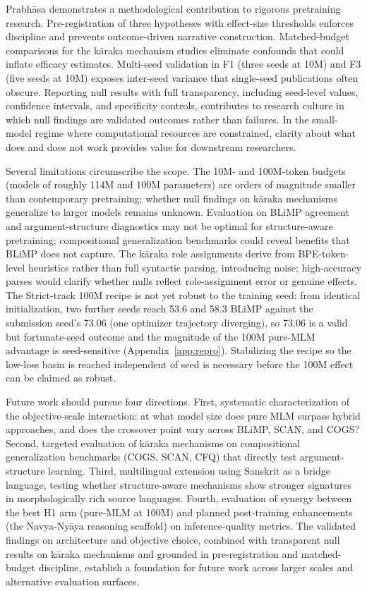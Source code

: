 Prabhāsa demonstrates a methodological contribution to rigorous pretraining research. Pre-registration of three hypotheses with effect-size thresholds enforces discipline and prevents outcome-driven narrative construction. Matched-budget comparisons for the k\=araka mechanism studies eliminate confounds that could inflate efficacy estimates. Multi-seed validation in F1 (three seeds at 10M) and F3 (five seeds at 10M) exposes inter-seed variance that single-seed publications often obscure. Reporting null results with full transparency, including seed-level values, confidence intervals, and specificity controls, contributes to research culture in which null findings are validated outcomes rather than failures. In the small-model regime where computational resources are constrained, clarity about what does and does not work provides value for downstream researchers.

Several limitations circumscribe the scope. The 10M- and 100M-token budgets (models of roughly 114M and 100M parameters) are orders of magnitude smaller than contemporary pretraining; whether null findings on k\=araka mechanisms generalize to larger models remains unknown. Evaluation on BLiMP agreement and argument-structure diagnostics may not be optimal for structure-aware pretraining; compositional generalization benchmarks could reveal benefits that BLiMP does not capture. The k\=araka role assignments derive from BPE-token-level heuristics rather than full syntactic parsing, introducing noise; high-accuracy parses would clarify whether nulls reflect role-assignment error or genuine effects. The Strict-track 100M recipe is not yet robust to the training seed: from identical initialization, two further seeds reach 53.6 and 58.3 BLiMP against the submission seed's 73.06 (one optimizer trajectory diverging), so 73.06 is a valid but fortunate-seed outcome and the magnitude of the 100M pure-MLM advantage is seed-sensitive (Appendix~\ref{app:repro}). Stabilizing the recipe so the low-loss basin is reached independent of seed is necessary before the 100M effect can be claimed as robust.

Future work should pursue four directions. First, systematic characterization of the objective-scale interaction: at what model size does pure MLM surpass hybrid approaches, and does the crossover point vary across BLiMP, SCAN, and COGS? Second, targeted evaluation of k\=araka mechanisms on compositional generalization benchmarks (COGS, SCAN, CFQ) that directly test argument-structure learning. Third, multilingual extension using Sanskrit as a bridge language, testing whether structure-aware mechanisms show stronger signatures in morphologically rich source languages. Fourth, evaluation of synergy between the best H1 arm (pure-MLM at 100M) and planned post-training enhancements (the Navya-Ny\=aya reasoning scaffold) on inference-quality metrics. The validated findings on architecture and objective choice, combined with transparent null results on k\=araka mechanisms and grounded in pre-registration and matched-budget discipline, establish a foundation for future work across larger scales and alternative evaluation surfaces.
